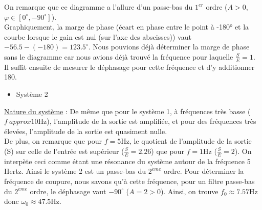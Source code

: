 \documentclass[12pt]{article}
\begin{document}
On remarque que ce diagramme a l'allure d'un passe-bas du $1^{er}$ ordre ($A > 0$, $\varphi \in [0^\circ,-90^\circ]$).
\\Graphiquement, la marge de phase (écart en phase entre le point à -180° et la courbe lorsque le gain est nul (sur l’axe des abscisses)) vaut $-56.5 - (-180) = 123.5^\circ$. Nous pouvions déjà déterminer la marge de phase sans le diagramme car nous avions déjà trouvé la fréquence pour laquelle $\frac{S}{E} = 1$.
\\Il suffit ensuite de mesurer le déphasage pour cette fréquence et d'y additionner 180.
\newpage


\begin{itemize}
    \item Système 2
\end{itemize}

\underline{Nature du système} : De même que pour le système 1, à fréquences très basse ($f \ approx 10$Hz), l'amplitude de la sortie est amplifiée, et pour des fréquences très élevées, l'amplitude de la sortie est quasiment nulle.
\\De plus, on remarque que pour $f = 5$Hz, le quotient de l'amplitude de la sortie (S) sur celle de l'entrée est supérieur ($\frac{S}{E} = 2.26$) que pour $f = 1$Hz ($\frac{S}{E} = 2$). On interpète ceci comme étant une résonance du système autour de la fréquence 5 Hertz.
Ainsi le système 2 est un passe-bas du $2^{\grave{e}  me}$ ordre. Pour déterminer la fréquence de coupure, nous savons qu'à cette fréquence, pour un filtre passe-bas du $2^{\grave{e}me}$ ordre, le déphasage vaut $-90^\circ$ ($A = 2 > 0$). Ainsi, on trouve $f_0 \approx 7.57$Hz donc $\omega_0 \approx 47.5$Hz.
\end{document}

